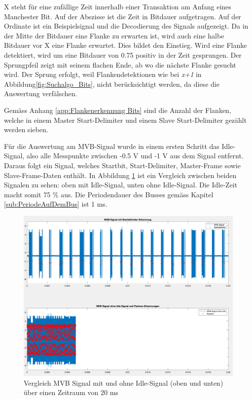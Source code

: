 X steht für eine zufällige Zeit innerhalb einer Transaktion am Anfang eines Manchester Bit. Auf der Abszisse ist die Zeit in Bitdauer aufgetragen. Auf der Ordinate ist ein Beispielsignal und die Decodierung des Signals aufgezeigt. Da in der Mitte der Bitdauer eine Flanke zu erwarten ist, wird auch eine halbe Bitdauer vor X eine Flanke erwartet. Dies bildet den Einstieg. Wird eine Flanke detektiert, wird um eine Bitdauer von 0.75 positiv in der Zeit gesprungen. Der Sprungpfeil zeigt mit seinem flachen Ende, ab wo die nächste Flanke gesucht wird. Der Sprung erfolgt, weil Flankendetektionen wie bei \textit{x+1} in Abbildung\ref{fig:Suchalgo_Bits}, nicht berücksichtigt werden, da diese die Auswertung verfälschen.

Gemäss Anhang \ref{app:Flankenerkennung Bits} sind die Anzahl der Flanken, welche in einem Master Start-Delimiter und einem Slave Start-Delimiter gezählt werden sieben.

Für die Auswertung am MVB-Signal wurde in einem ersten Schritt das Idle-Signal, also alle Messpunkte zwischen -0.5 V und -1 V aus dem Signal entfernt. Daraus folgt ein Signal,  welches Startbit, Start-Delimiter, Master-Frame sowie Slave-Frame-Daten enthält. In Abbildung \ref{fig:ReineDaten} ist ein Vergleich zwischen beiden Signalen zu sehen: oben mit Idle-Signal, unten ohne Idle-Signal. Die Idle-Zeit macht somit 75 \% aus. Die Periodendauer des Busses gemäss Kapitel \ref{sub:PeriodeAufDemBus} ist 1 ms.

\begin{figure}[H]
    \centering
    \includegraphics[width=0.75\linewidth]{Figures/Chap3/Busauslastung/Vergleich_MVB_mit_ohne_Idle.png}
    \caption{Vergleich MVB Signal mit und ohne Idle-Signal (oben und unten) über einen Zeitraum von 20 ms}
    \label{fig:ReineDaten}
\end{figure}

